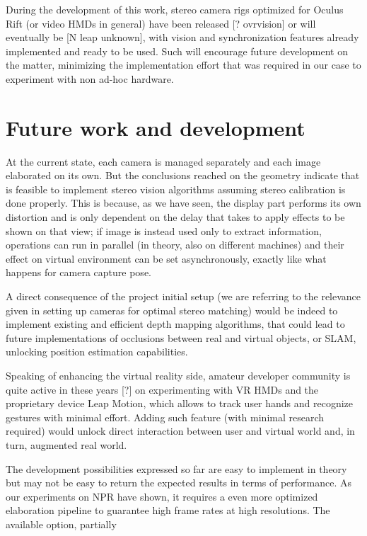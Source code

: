 During the development of this work, stereo camera rigs optimized for Oculus Rift (or video HMDs in general) have been released [? ovrvision] or will eventually be [N leap unknown], with vision and synchronization features already implemented and ready to be used. Such will encourage future development on the matter, minimizing the implementation effort that was required in our case to experiment with non ad-hoc hardware.

\section{Future work and development}
At the current state, each camera is managed separately and each image elaborated on its own. But the conclusions reached on the geometry indicate that is feasible to implement stereo vision algorithms assuming stereo calibration is done properly. This is because, as we have seen, the display part performs its own distortion and is only dependent on the delay that takes to apply effects to be shown on that view; if image is instead used only to extract information, operations can run in parallel (in theory, also on different machines) and their effect on virtual environment can be set asynchronously, exactly like what happens for camera capture pose.

A direct consequence of the project initial setup (we are referring to the relevance given in setting up cameras for optimal stereo matching) would be indeed to implement existing and efficient depth mapping algorithms, that could lead to future implementations of occlusions between real and virtual objects, or SLAM, unlocking position estimation capabilities.

Speaking of enhancing the virtual reality side, amateur developer community is quite active in these years [?] on experimenting with VR HMDs and the proprietary device Leap Motion, which allows to track user hands and recognize gestures with minimal effort. Adding such feature (with minimal research required) would unlock direct interaction between user and virtual world and, in turn, augmented real world.

The development possibilities expressed so far are easy to implement in theory but may not be easy to return the expected results in terms of performance. As our experiments on NPR have shown, it requires a even more optimized elaboration pipeline to guarantee high frame rates at high resolutions. The available option, partially 

\iffalse

